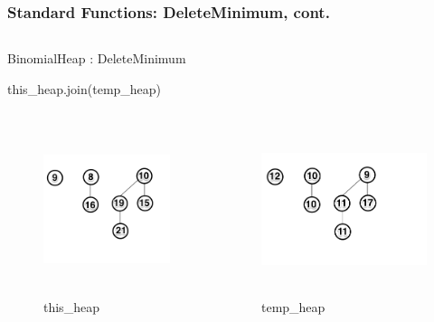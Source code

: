 \documentclass[13pt]{beamer}
\begin{document}
\begin{frame}
\frametitle{Standard Functions: DeleteMinimum, cont.}

  \begin{columns}[T] %
    \begin{column}[T]{8cm} %
        \begin{algorithm}[H]
        \small
        \caption{BinomialHeap : DeleteMinimum}
        \begin{algorithmic}
          \STATE this\_heap.join(temp\_heap)
        \end{algorithmic}
        \end{algorithm}
    \end{column}
  \end{columns}


  \begin{columns}[T] %
    \begin{column}[T]{3.75cm} %
        \begin{figure}
          \caption{this\_heap}
          \includegraphics[height=5cm]{./img/postdeleteminA.png}
        \end{figure}
    \end{column}
    \begin{column}[T]{3.75cm} %
        \begin{figure}
          \caption{temp\_heap}
          \includegraphics[height=5cm]{./img/postdeleteminB.png}
        \end{figure}
    \end{column}
  \end{columns}

\end{frame}
\end{document}
